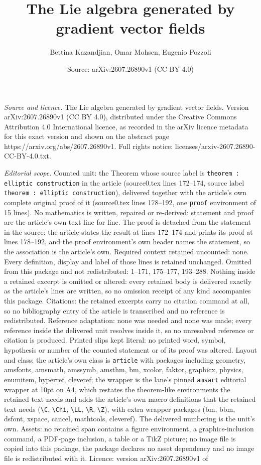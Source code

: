 \documentclass[10pt,a4paper]{amsart}
\title[The Lie algebra generated by gradient vector fields]{The Lie algebra generated by gradient vector fields}
\author{Bettina Kazandjian, Omar Mohsen, Eugenio Pozzoli}
\date{Source: arXiv:2607.26890v1 (CC BY 4.0)}
\begin{document}
\maketitle

\noindent\emph{Source and licence.} The Lie algebra generated by gradient vector fields. Version arXiv:2607.26890v1 (CC BY 4.0), distributed under the Creative Commons Attribution 4.0 International licence, as recorded in the arXiv licence metadata for this exact version and shown on the abstract page https://arxiv.org/abs/2607.26890v1. Full rights notice: licenses/arxiv-2607.26890-CC-BY-4.0.txt.\par\smallskip

\noindent\textit{Editorial scope.} Counted unit: the Theorem whose source label is \texttt{theorem : elliptic construction} in the article (source0.tex lines 172--174, source label \texttt{theorem : elliptic construction}), delivered together with the article's own complete original proof of it (source0.tex lines 178--192, one \texttt{proof} environment of 15 lines). No mathematics is written, repaired or re-derived: statement and proof are the article's own text line for line. The proof is detached from the statement in the source: the article states the result at lines 172--174 and prints its proof at lines 178--192, and the proof environment's own header names the statement, so the association is the article's own. Required context retained uncounted: none. Every definition, display and label of those lines is retained unchanged. Omitted from this package and not redistributed: 1--171, 175--177, 193--288. Nothing inside a retained excerpt is omitted or altered: every retained body is delivered exactly as the article's lines are written, so no omission receipt of any kind accompanies this package. Citations: the retained excerpts carry no citation command at all, so no bibliography entry of the article is transcribed and no reference is redistributed. Reference adaptation: none was needed and none was made; every reference inside the delivered unit resolves inside it, so no unresolved reference or citation is produced. Printed slips kept literal: no printed word, symbol, hypothesis or number of the counted statement or of its proof was altered. Layout and class: the article's own class is \texttt{article} with packages including geometry, amsfonts, amsmath, amssymb, amsthm, bm, xcolor, faktor, graphicx, physics, enumitem, hyperref, cleveref; the wrapper is the lane's pinned \texttt{amsart} editorial wrapper at 10pt on A4, which restates the theorem-like environments the retained text needs and adds the article's own macro definitions that the retained text needs (\texttt{\textbackslash C}, \texttt{\textbackslash Chi}, \texttt{\textbackslash LL}, \texttt{\textbackslash R}, \texttt{\textbackslash Z}), with extra wrapper packages (bm, bbm, dsfont, xspace, cancel, mathtools, cleveref). The delivered numbering is the unit's own. Assets: no retained span contains a figure environment, a graphics-inclusion command, a PDF-page inclusion, a table or a TikZ picture; no image file is copied into this package, the package declares no asset dependency and no image file is redistributed with it. Licence: version arXiv:2607.26890v1 of 
\end{document}

